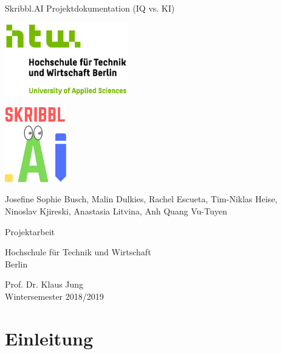 \documentclass[11pt]{article}
\begin{document}
\begin{titlepage}
   \begin{center}
       \vspace*{1cm}

       \Huge
       Skribbl.AI Projektdokumentation (IQ vs. KI)
       \vspace{1.5cm}

       \includegraphics[width=0.4\textwidth]{images/logo_htw.jpg}

       \vspace{1.0cm}
       \includegraphics[width=0.2\textwidth]{images/logo_skribbl.png}
       \vspace{1.0cm}
       \LARGE

       Josefine Sophie Busch, Malin Dulkies, Rachel Escueta, Tim-Niklas Heise, Ninoslav Kjireski, Anastasia Litvina, Anh Quang Vu-Tuyen

       \vfill

       Projektarbeit \\

       \vspace{0.8cm}

       Hochschule für Technik und Wirtschaft\\
       Berlin\\

   \end{center}
\end{titlepage}

       Prof. Dr. Klaus Jung\\
       Wintersemester 2018/2019\\
\pagebreak
\tableofcontents
\pagebreak
\listoftables
\listoffigures
\pagebreak

\section{Einleitung}
\label{chap: Einleitung}
\end{document}
